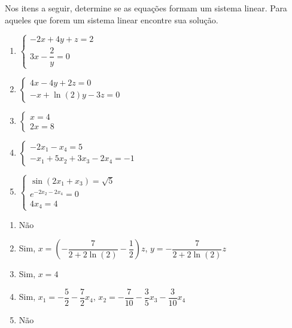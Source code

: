\documentclass[12pt]{exam}
\begin{document}
\begin{exercicio}
  Nos itens a seguir, determine se as equações formam um sistema linear. Para aqueles que forem um sistema linear encontre sua solução.
  \begin{enumerate}
    \item $\begin{cases} -2x + 4y + z = 2\\ 3x - \dfrac{2}{y} = 0\end{cases}$
    \item $\begin{cases} 4x - 4y + 2z = 0\\ -x + \ln(2)y - 3z = 0\end{cases}$
    \item $\begin{cases} x = 4\\ 2x = 8\end{cases}$
    \item $\begin{cases} -2x_1 - x_4 = 5\\ -x_1 + 5x_2 + 3x_3 - 2x_4 = -1\end{cases}$
    \item $\begin{cases} \sin(2x_1 + x_3) = \sqrt{5}\\ e^{-2x_2 - 2x_4} = 0\\ 4x_4 = 4\end{cases}$
  \end{enumerate}
  \begin{solucao}
    \begin{enumerate}
      \item Não
    \item Sim, $x = \left(-\dfrac{7}{2 + 2\ln(2)} - \dfrac{1}{2}\right)z$, $y = -\dfrac{7}{2 + 2\ln(2)}z$
      \item Sim, $x = 4$
      \item Sim, $x_1 = -\dfrac{5}{2} - \dfrac{7}{2}x_4$, $x_2 = -\dfrac{7}{10} - \dfrac{3}{5}x_3 - \dfrac{3}{10}x_4$
      \item Não
    \end{enumerate}
  \end{solucao}
\end{exercicio}
\end{document}
